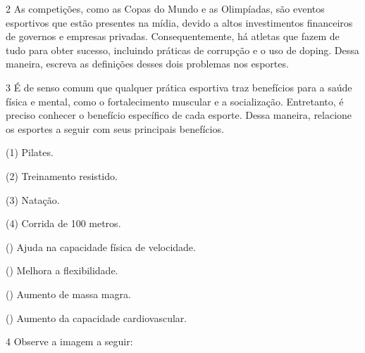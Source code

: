
\num{2} As competições, como as Copas do Mundo e as Olimpíadas, são
eventos esportivos que estão presentes na mídia, devido a altos
investimentos financeiros de governos e empresas privadas.
Consequentemente, há atletas que fazem de tudo para obter sucesso, 
incluindo práticas de corrupção e o uso de doping. Dessa maneira, 
escreva as definições desses dois problemas nos esportes.



\num{3} É de senso comum que qualquer prática esportiva traz benefícios 
para a saúde física e mental, como o fortalecimento muscular e a
socialização. Entretanto, é preciso conhecer o benefício específico de
cada esporte. Dessa maneira, relacione os esportes a seguir com seus 
principais benefícios.

\begin{multicols}{2}
(1) Pilates.\medskip

(2) Treinamento resistido.\medskip

(3) Natação.\medskip

(4) Corrida de 100 metros.

\columnbreak

() Ajuda na capacidade física de velocidade.

() Melhora a flexibilidade.

() Aumento de massa magra.

() Aumento da capacidade cardiovascular.
\end{multicols}


\num{4}  Observe a imagem a seguir:

